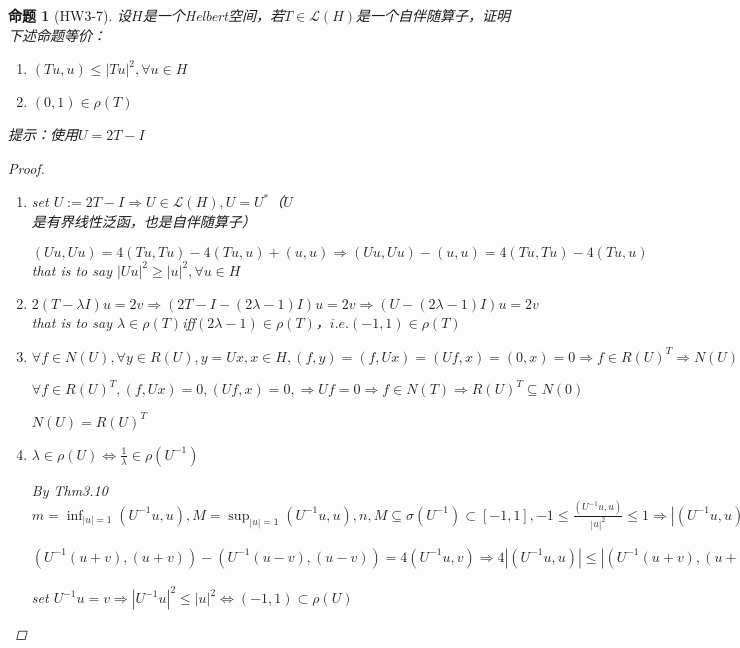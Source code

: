 \documentclass{article}                     %
\numberwithin{equation}{section}            %
\numberwithin{figure}{section}              %
\numberwithin{table}{section}               %
\newtheorem{proposition}[theorem]{\indent 命题}
\begin{document}
\begin{proposition}[HW3-7]
    设$H$是一个Helbert空间，若$T\in \mathcal{L} (H)$是一个自伴随算子，证明下述命题等价：
    \begin{enumerate}
        \item $(Tu,u)\le |Tu|^2,\forall u\in H$
        \item $(0,1)\in \rho (T)$
    \end{enumerate}
    提示：使用$U=2T-I$
    \begin{proof}
        \begin{enumerate}
            \item set $U:=2T-I \Rightarrow U\in \mathcal{L} (H),U=U^\ast $（$U$是有界线性泛函，也是自伴随算子）
            
            $(Uu,Uu)=4(Tu,Tu)-4(Tu,u)+(u,u) \Rightarrow (Uu,Uu)-(u,u)=4(Tu,Tu)-4(Tu,u)$that is to say $|Uu|^2\ge |u|^2,\forall u\in H$
            \item $2(T-\lambda I)u=2v \Rightarrow (2T-I-(2\lambda-1)I)u=2v \Rightarrow (U-(2\lambda-1)I)u=2v$ that is to say $\lambda \in \rho (T)$iff$(2\lambda -1)\in \rho(T)$，$i.e. (-1,1)\in \rho(T)$
            \item $\forall f\in N(U),\forall y\in R(U),y=Ux,x\in H,(f,y)=(f,Ux)=(Uf,x)=(0,x)=0 \Rightarrow f\in R(U)^T\Rightarrow N(U)\subseteq R(U)^T$
            
            $\forall f\in R(U)^T,(f,Ux)=0,(Uf,x)=0,\Rightarrow Uf=0\Rightarrow f\in N(T)\Rightarrow R(U)^T\subseteq N(0)$

            $N(U)=R(U)^T$
            \item $\lambda \in \rho(U)\Leftrightarrow \frac{1}{\lambda }\in \rho (U^{-1})$
            
            By Thm3.10$m=\inf_{|u|=1}(U^{-1}u,u),M=\sup_{|u|=1}(U^{-1}u,u),n,M\subseteq \sigma (U^{-1})\subset[-1,1],-1\le \frac{(U^{-1}u,u)}{|u|^2}\le 1\Rightarrow |(U^{-1}u,u)|\le |u|$

            $(U^{-1}(u+v),(u+v))-(U^{-1}(u-v),(u-v))=4(U^{-1}u,v)\Rightarrow 4|(U^{-1}u,u)|\le |(U^{-1}(u+v),(u+v))|+|(U^{-1}(u-v),(u-v))|\le |u+v|^2+|u-v|^2=2(|u|^2+|v|^2)$

            set $U^{-1}u=v\Rightarrow |U^{-1}u|^2\le |u|^2\Leftrightarrow (-1,1)\subset \rho (U)$
            
        \end{enumerate}
    \end{proof}
\end{proposition}
\end{document}

